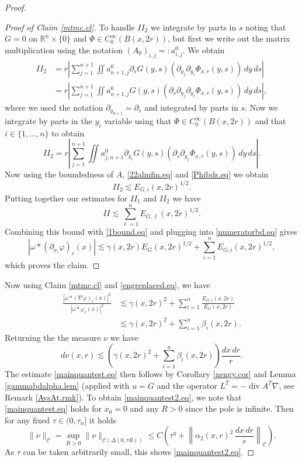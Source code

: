 \documentclass[11pt, a4paper,leqno]{amsart}
\theoremstyle{plain}
\theoremstyle{definition}
\theoremstyle{remark}
\numberwithin{equation}{section}
\def\div{\mathop{\operatorname{div}}\nolimits}
\begin{document}
\begin{proof}
\begin{proof}[Proof of Claim \ref{mtmc.cl}]
To handle $II_2$ we integrate by parts in $s$ noting that $G = 0$ on $\mathbb{R}^{n} \times \{0\}$ and $\Phi \in C_0^\infty(B(x,2r))$, but first we write out the matrix multiplication using the notation $(A_0)_{i,j} =: a^0_{i,j}$. We obtain 
\begin{align*}
II_2 &=r \left| \sum_{j = 1}^{n+1} \iint a^0_{ n+1,j} \partial_s G(y,s) (\partial_{y_j}\partial_{y_i} \Phi_{x,r}(y,s)) \, dy \, ds\right| 
\\& = r \left| \sum_{j = 1}^{n+1} \iint a^0_{ n+1,j}  G(y,s)  (\partial_s \partial_{y_j}\partial_{y_i} \Phi_{x,r}(y,s)) \, dy \, ds\right|,
\end{align*}
where we used the notation $\partial_{y_{n+1}} = \partial_s$ and integrated by parts in $s$. Now we integrate by parts in the $y_i$ variable using that $\Phi \in C_0^\infty(B(x,2r))$ and that $i \in \{1,\dots, n\}$ to obtain
\begin{equation}\label{22almfin.eq}
II_2 = r \left| \sum_{j = 1}^{n+1} \iint a_{j, n+1}^0  \partial_{y_i} G(y,s) (\partial_s \partial_{y_j} \Phi_{x,r}(y,s)) \, dy \, ds\right|.
\end{equation}
Now using the boundedness of $A$, \eqref{22almfin.eq} and \eqref{Phibds.eq} we obtain
\[II_2 \lesssim E_{G,i}(x,2r)^{1/2}.\]
Putting together our estimates for $II_1$ and $II_2$ we have
\[II \lesssim  \sum_{\ell = 1}^n E_{G,\ell}(x,2r)^{1/2}.\]
Combining this bound with \eqref{1bound.eq} and plugging into  \eqref{numeratorbd.eq} gives
\[ |\omega \ast (\partial_{x_i} \varphi)_r(x)| \lesssim \gamma(x, 2 r) E_G(x,2 r)^{1/2} + \sum_{i = 1}^n E_{G,i}(x,2r)^{1/2},\]
which proves the claim.
\end{proof}
Now using Claim \ref{mtmc.cl} and \eqref{engreplaced.eq}, we have
\begin{equation}\label{alfinqtest.eq}
\begin{split}
\frac{|\omega \ast (\nabla \varphi)_r(x)|^2}{|\omega \ast \varphi_r(x)|^2} &\lesssim \gamma(x, 2 r)^2 + \sum_{i = 1}^n \frac{E_{G,i}(x,2r)}{E_G(x,2r)}
\\ & \lesssim \gamma(x, 2 r)^2 + \sum_{i = 1}^n \beta_i(x,2r).
\end{split}
\end{equation}
Returning the the measure $\nu$ we have
\begin{equation}\label{ptwisedensitybd1.eq}
d\nu(x,r) \lesssim \left( \gamma(x, 2 r)^2 + \sum_{i = 1}^n \beta_i(x,2r) \right) \frac{dx \, dr}{r}.
\end{equation}
The estimate \eqref{mainquantest.eq} then follows by Corollary \ref{xengy.cor} and Lemma \ref{gammabdalpha.lem} (applied with $u = G$ and the operator $L^T = -\div A^T \nabla$, see Remark \ref{AvsAt.rmk}). To obtain \eqref{mainquantest2.eq}, we note that \eqref{mainquantest.eq} holds for $x_0 = 0$ and any $R > 0$ since the pole is infinite. Then for any fixed $\tau \in (0,\tau_n]$ it holds
\[\|\nu\|_{\mathcal{C}} = \sup_{R > 0} \|\nu\|_{\mathcal{C}(\Delta(0,\tau R))} \le C \left(\tau^\eta + \left\|\alpha_2(x,r)^2 \, \frac{dx\, dr}{r}\right\|_{\mathcal{C}}\right).\]
As $\tau$ can be taken arbitrarily small, this shows \eqref{mainquantest2.eq}.

\end{proof}
\end{document}

